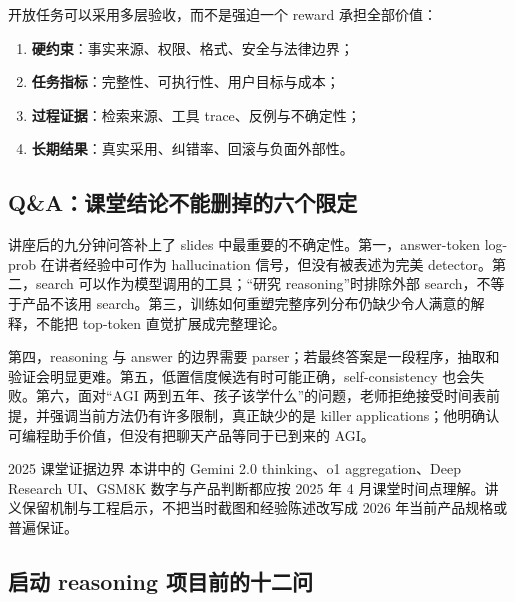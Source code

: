 \documentclass[a4paper]{article}
\begin{document}
开放任务可以采用多层验收，而不是强迫一个 reward 承担全部价值：
\begin{enumerate}
  \item \textbf{硬约束}：事实来源、权限、格式、安全与法律边界；
  \item \textbf{任务指标}：完整性、可执行性、用户目标与成本；
  \item \textbf{过程证据}：检索来源、工具 trace、反例与不确定性；
  \item \textbf{长期结果}：真实采用、纠错率、回滚与负面外部性。
\end{enumerate}

\subsection{Q\&A：课堂结论不能删掉的六个限定}

讲座后的九分钟问答补上了 slides 中最重要的不确定性。第一，answer-token log-prob 在讲者经验中可作为 hallucination 信号，但没有被表述为完美 detector。第二，search 可以作为模型调用的工具；“研究 reasoning”时排除外部 search，不等于产品不该用 search。第三，训练如何重塑完整序列分布仍缺少令人满意的解释，不能把 top-token 直觉扩展成完整理论。


第四，reasoning 与 answer 的边界需要 parser；若最终答案是一段程序，抽取和验证会明显更难。第五，低置信度候选有时可能正确，self-consistency 也会失败。第六，面对“AGI 两到五年、孩子该学什么”的问题，老师拒绝接受时间表前提，并强调当前方法仍有许多限制，真正缺少的是 killer applications；他明确认可编程助手价值，但没有把聊天产品等同于已到来的 AGI。


\begin{warningbox}{2025 课堂证据边界}
本讲中的 Gemini 2.0 thinking、o1 aggregation、Deep Research UI、GSM8K 数字与产品判断都应按 2025 年 4 月课堂时间点理解。讲义保留机制与工程启示，不把当时截图和经验陈述改写成 2026 年当前产品规格或普遍保证。
\end{warningbox}

\subsection{启动 reasoning 项目前的十二问}
\end{document}
